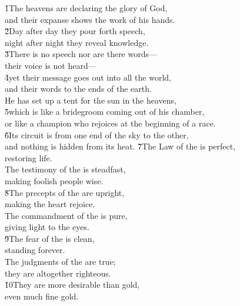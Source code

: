 \begin{poetry}
\poeml \v{1}The heavens are declaring the glory of God, \\
\poemll    and their expanse shows the work of his hands. \\
\poeml \v{2}Day after day they pour forth speech, \\
\poemll    night after night they reveal knowledge. \\
\poeml \v{3}There is no speech nor are there words--- \\
\poemll    their voice is not heard--- \\
\poeml \v{4}yet their message goes out into all the world, \\
\poemll    and their words to the ends of the earth. \\
\poeml He has set up a tent for the sun in the heavens, \\
\poeml \v{5}which is like a bridegroom coming out of his chamber, \\
\poemlll       or like a champion who rejoices at the beginning of a race. \\
\poeml \v{6}Its circuit is from one end of the sky to the other, \\
\poemll    and nothing is hidden from its heat.
\poeml \v{7}The Law of the  is perfect, \\
\poemll    restoring life. \\
\poeml The testimony of the  is steadfast, \\
\poemll    making foolish people wise. \\
\poeml \v{8}The precepts of the  are upright, \\
\poemll    making the heart rejoice. \\
\poeml The commandment of the  is pure, \\
\poemll    giving light to the eyes. \\
\poeml \v{9}The fear of the  is clean, \\
\poemll    standing forever. \\
\poeml The judgments of the  are true; \\
\poemll    they are altogether righteous. \\
\poeml \v{10}They are more desirable than gold, \\
\poemll    even much fine gold. \\

\end{poetry}
